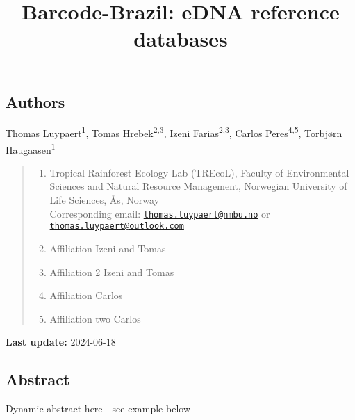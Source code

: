 \documentclass[
  letterpaper,
  DIV=11,
  numbers=noendperiod]{scrartcl}
\title{Barcode-Brazil: eDNA reference databases}
\author{}
\date{}
\begin{document}
\maketitle

\subsection{Authors}\label{authors}

Thomas Luypaert\textsuperscript{1}, Tomas Hrebek\textsuperscript{2,3},
Izeni Farias\textsuperscript{2,3}, Carlos Peres\textsuperscript{4,5},
Torbjørn Haugaasen\textsuperscript{1}

\begin{quote}
\begin{enumerate}
\def\labelenumi{(\arabic{enumi})}
\item
  Tropical Rainforest Ecology Lab (TREcoL), Faculty of Environmental
  Sciences and Natural Resource Management, Norwegian University of Life
  Sciences, Ås, Norway\\
  Corresponding email:
  \href{mailto:thomas.luypaert@nmbu.no}{\nolinkurl{thomas.luypaert@nmbu.no}}
  or
  \href{mailto:thomas.luypaert@outlook.com}{\nolinkurl{thomas.luypaert@outlook.com}}
\item
  Affiliation Izeni and Tomas
\item
  Affiliation 2 Izeni and Tomas
\item
  Affiliation Carlos
\item
  Affiliation two Carlos
\end{enumerate}
\end{quote}

\textbf{Last update:} 2024-06-18

\subsection{Abstract}\label{abstract}

Dynamic abstract here - see example below
\end{document}
